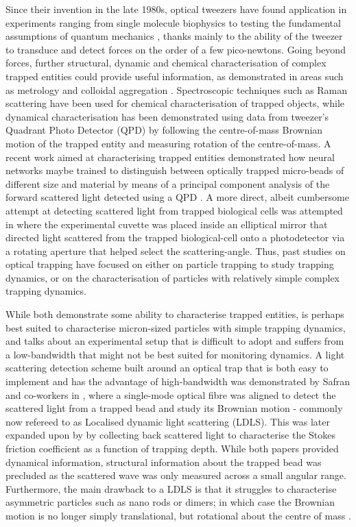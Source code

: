 \documentclass[final,  3p]{elsarticle}
\begin{document}
Since their invention in the late 1980s, optical tweezers have found application in experiments ranging from single molecule biophysics \cite{Bustamante2021Biophysics} to testing the fundamental assumptions of quantum mechanics \cite{yin2013large}, thanks mainly to the ability of the tweezer to transduce and detect forces on the order of a few pico-newtons. Going beyond forces, further structural, dynamic and chemical characterisation of complex trapped entities could provide useful information, as demonstrated in areas such as metrology \cite{arita2020coherent} and colloidal aggregation \cite{burns1990optical}.  Spectroscopic techniques such as Raman scattering \cite{gupta2014raman} have been used for chemical characterisation of trapped objects, while dynamical characterisation has been demonstrated using data from tweezer's Quadrant Photo Detector (QPD) by following the centre-of-mass Brownian motion of the trapped entity \cite{friedrich2012tuning} and measuring rotation of the centre-of-mass\cite{yifat2021facile}.  A recent work aimed at characterising trapped entities demonstrated how neural networks maybe trained to distinguish between optically trapped micro-beads of different size and material by means of a principal component analysis of the forward scattered light detected using a QPD \cite{Carvalho_2023}. A more direct, albeit cumbersome attempt at detecting scattered light from trapped biological cells was attempted in \cite{Watson_2023} where the experimental cuvette was placed inside an elliptical mirror that directed light scattered from the trapped biological-cell onto a photodetector via a rotating aperture that helped select the scattering-angle. Thus, past studies on optical trapping have focused on either on particle trapping to study trapping dynamics, or on the characterisation of particles with relatively simple complex trapping dynamics.  

While both \cite{Carvalho_2023} \cite{Watson_2023} demonstrate some ability to characterise trapped entities, \cite{Carvalho_2023} is perhaps best suited to characterise micron-sized particles with simple trapping dynamics, and \cite{Watson_2023} talks about an experimental setup that is difficult to adopt and suffers from a low-bandwidth that might not be best suited for monitoring dynamics. A light scattering detection scheme built around an optical trap that is both easy to implement and has the advantage of high-bandwidth was demonstrated by Safran and co-workers in \cite{Bar-Ziv_1998}, where a single-mode optical fibre was aligned to detect the scattered light from a trapped bead and study its Brownian motion - commonly now refereed to as Localised dynamic light scattering (LDLS). This was later expanded upon by \cite{PhysRevE.65.041921} by collecting back scattered light to characterise the Stokes friction coefficient as a function of trapping depth. While both papers provided dynamical information, structural information about the trapped bead was precluded as the scattered wave was only measured across a small angular range. Furthermore, the main drawback to a LDLS is that it struggles to characterise asymmetric particles such as nano rods or dimers; in which case the Brownian motion is no longer simply translational, but rotational about the centre of mass \cite{yin2013large}.
\end{document}
